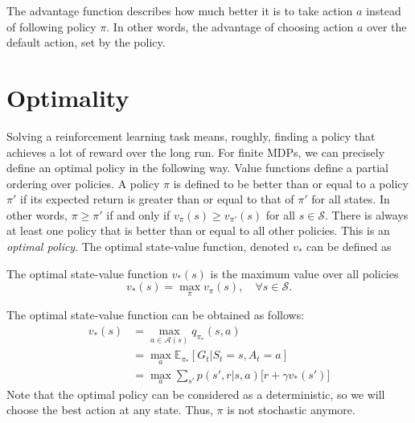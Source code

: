 The advantage function describes how much better it is to take action $a$ instead of following policy $\pi$. In other words, the advantage of choosing action $a$ over the default action, set by the policy.

\section{Optimality}

Solving a reinforcement learning task means, roughly, finding a policy that achieves a lot of reward over the long run. For finite MDPs, we can precisely define an optimal policy in the following way. Value functions define a partial ordering over policies. A policy $\pi$ is defined to be better than or equal to a policy $\pi'$ if its expected return is greater than or equal to that of $\pi'$ for all states. In other words, $\pi\geq \pi'$ if and only if $v_\pi(s)\geq v_{\pi'}(s)$ for all $s\in \mathcal{S}$. There is always at least one policy that is better than or equal to all other policies. This is an \textit{optimal policy}. The optimal state-value function, denoted $v_*$ can be defined as 


\begin{definition}
	The optimal state-value function $v_{*}(s)$ is the maximum value over all policies
	$$v_{*}(s) = \max_{\pi} v_{\pi}(s),\quad \forall s\in \mathcal{S}.$$
\end{definition}
The optimal state-value function can be obtained as follows:
\begin{align*}
	v_*(s) &= \max_{a\in \mathcal{A}(s)}q_{\pi_*}(s,a)\\
	&= \max_a \mathbb{E}_{\pi_*}[G_t| S_t=s, A_t=a]\\
	&= \max_a \sum_{s'}p(s',r|s,a)\Big[r + \gamma  v_*(s')\Big] 
\end{align*}
Note that the optimal policy can be considered as a deterministic, so we will choose the best action at any state. Thus, $\pi$ is not stochastic anymore. 

